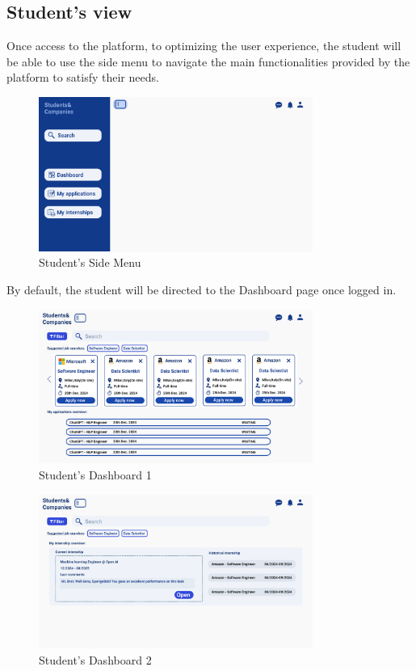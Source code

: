 \subsection{Student's view}
Once access to the platform, to optimizing the user experience, the student will be able to use the side menu to navigate the main 
functionalities provided by the platform to satisfy their needs. 
\begin{figure}[H]
    \centering
    \includegraphics[width=0.8\textwidth]{Images/UI/Layout-Student.png}
    \caption{Student's Side Menu}\label{fig:Student_view}
\end{figure}
By default, the student will be directed to the Dashboard page once logged in. %
\begin{figure}[H]
    \centering
    \includegraphics[width=0.8\textwidth]{Images/UI/Dashboard 1-student.png}
    \caption{Student's Dashboard 1}\label{fig:DashboardStudent1}
\end{figure}

\begin{figure}[H]
    \centering
    \includegraphics[width=0.8\textwidth]{Images/UI/Dashboard 2-student.png}
    \caption{Student's Dashboard 2}\label{fig:Dashboard Student 2}
\end{figure}

